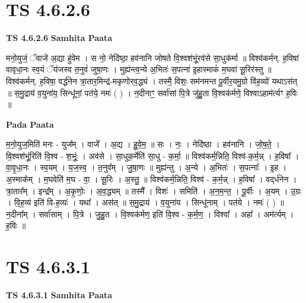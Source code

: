 \documentclass[17pt]{extarticle}
\begin{document}
\section*{ TS 4.6.2.6 }

\textbf{TS 4.6.2.6 } \newline
\textbf{Samhita Paata} \newline

मनो॒युजं॒ ॅवाजे॑ अ॒द्या हु॑वेम । स नो॒ नेदि॑ष्ठा॒ हव॑नानि जोषते वि॒श्वश॑भूं॒रव॑से सा॒धुक॑र्मा ॥ विश्व॑कर्मन्. ह॒विषा॑ वावृधा॒नः स्व॒यं ॅय॑जस्व त॒नुवं॑ जुषा॒णः । मुह्य॑न्त्व॒न्ये अ॒भितः॑ स॒पत्ना॑ इ॒हास्माकं॑ म॒घवा॑ सू॒रिर॑स्तु ॥ विश्व॑कर्मन्. ह॒विषा॒ वर्द्ध॑नेन त्रा॒तार॒मिन्द्र॑-मकृणोरव॒द्ध्यं । तस्मै॒ विशः॒ सम॑नमन्त पू॒र्वीर॒यमु॒ग्रो वि॑ह॒व्यो॑ यथाऽस॑त् ॥ स॒मु॒द्राय॑ व॒युना॑य॒ सिन्धू॑नां॒ पत॑ये॒ नमः॑ ( ) । न॒दीनाꣳ॒॒ सर्वा॑सां पि॒त्रे जु॑हु॒ता वि॒श्वक॑र्मणे॒ विश्वाऽहाम॑र्त्यꣳ ह॒विः ॥ \newline

\textbf{Pada Paata} \newline

म॒नो॒युज॒मिति॑ मनः - युज᳚म् । वाजे᳚ । अ॒द्य । हु॒वे॒म॒ ॥ सः । नः॒ । नेदि॑ष्ठा । हव॑नानि । जो॒ष॒ते॒ । वि॒श्वश॑भूं॒रिति॑ वि॒श्व - श॒भूंः॒ । अव॑से । सा॒धुक॒र्मेति॑ सा॒धु - क॒र्मा॒ ॥ विश्व॑कर्म॒न्निति॒ विश्व॑-क॒र्म॒न्न् । ह॒विषा᳚ । वा॒वृ॒धा॒नः । स्व॒यम् । य॒ज॒स्व॒ । त॒नुव᳚म् । जु॒षा॒णः ॥ मुह्य॑न्तु । अ॒न्ये । अ॒भितः॑ । स॒पत्नाः᳚ । इ॒ह । अ॒स्माक᳚म् । म॒घवेति॑ म॒घ - वा॒ । सू॒रिः । अ॒स्तु॒ ॥ विश्व॑कर्म॒न्निति॒ विश्व॑ - क॒र्म॒न्न् । ह॒विषा᳚ । वद्‌र्ध॑नेन । त्रा॒तार᳚म् । इन्द्र᳚म् । अ॒कृ॒णोः॒ । अ॒व॒द्ध्यम् ॥ तस्मै᳚ । विशः॑ । समिति॑ । अ॒न॒म॒न्त॒ । पू॒र्वीः । अ॒यम् । उ॒ग्रः । वि॒ह॒व्य॑ इति॑ वि-ह॒व्यः॑ । यथा᳚ । अस॑त् ॥ स॒मु॒द्राय॑ । व॒युना॑य । सिन्धू॑नाम् । पत॑ये । नमः॑ ( ) ॥ न॒दीना᳚म् । सर्वा॑साम् । पि॒त्रे । जु॒हु॒त । वि॒श्वक॑र्मण॒ इति॑ वि॒श्व - क॒र्म॒ण॒ । विश्वा᳚ । अहा᳚ । अम॑र्त्यम् । ह॒विः ॥  \newline




\section*{ TS 4.6.3.1 }

\textbf{TS 4.6.3.1 } \newline
\textbf{Samhita Paata} \newline
\end{document}
